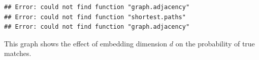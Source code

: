 \documentclass[11pt]{article} %
\begin{document}
  
\begin{knitrout}
\color{fgcolor}\begin{kframe}
\begin{verbatim}
## Error: could not find function "graph.adjacency"
## Error: could not find function "shortest.paths"
## Error: could not find function "graph.adjacency"
\end{verbatim}
\end{kframe}
\end{knitrout}


This graph shows the effect of embedding dimension $d$ on the probability of true matches.

%
%
\end{document}
